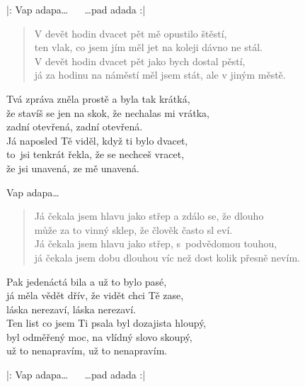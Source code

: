 \begin{song}{}
\begin{refren}
   |: Vap adapa\ldots{}    ~~ \ldots{}pad adada :|
\end{refren}
\begin{verse}
   V devět hodin dvacet pět mě opustilo štěstí, \\
   ten vlak, co jsem jím měl jet na koleji dávno ne stál. \\
   V devět hodin dvacet pět jako bych dostal pěstí, \\
   já za hodinu na náměstí měl jsem stát, ale v jiným městě.
\end{verse}
\begin{deco}
   Tvá zpráva zněla prostě a byla tak krátká, \\
   že stavíš se jen na skok, že nechalas mi vrátka, \\
   zadní otevřená, zadní otevřená. \\
   Já naposled Tě viděl, když ti bylo dvacet, \\
   to~jsi tenkrát řekla, že se nechceš vracet, \\
   že jsi unavená, ze mě unavená.
\end{deco}
\begin{refren}
   Vap adapa\ldots{}      ~~~  
\end{refren}
\chordbreak
\compactbreak
\begin{verse}
   Já čekala jsem hlavu jako střep a zdálo se, že dlouho \\
   může za to vinný sklep, že člověk často sl eví. \\
   Já čekala jsem hlavu jako střep, s~podvědomou touhou, \\
   já čekala jsem dobu dlouhou víc než dost kolik přesně nevím.
\end{verse}
\begin{deco}
   Pak jedenáctá bila a už to bylo pasé, \\
   já měla vědět dřív, že vidět chci Tě zase, \\
   láska nerezaví, láska nerezaví. \\
   Ten list co jsem Ti psala byl dozajista hloupý, \\
   byl odměřený moc, na vlídný slovo skoupý, \\
   už to nenapravím, už to nenapravím.
\end{deco}
\begin{refren}
   |: Vap adapa\ldots{}    ~~ \ldots{}pad adada :|
\end{refren}
\end{song}
\pagebreak
